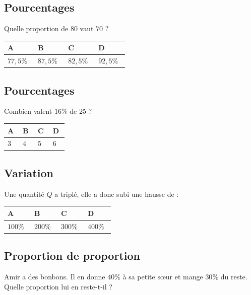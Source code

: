 \documentclass[oneside,12pt]{article}
\begin{document}
\subsection{Pourcentages}
Quelle proportion de $80$ vaut $70$ ?

\begin{center}
	\renewcommand{\arraystretch}{1.35}
	\begin{tabular}{| P{0.22\linewidth} | P{0.22\linewidth} | P{0.22\linewidth} | P{0.22\linewidth} |} \hline
	A & B & C & D \\ \hline
	$77,5\%$ & $87,5\%$ & $82,5\%$ & $92,5\%$ \\\hline
	\end{tabular}
\end{center}



\subsection{Pourcentages}
Combien valent $16\%$ de 25 ? 

\begin{center}
	\renewcommand{\arraystretch}{1.35}
	\begin{tabular}{| P{0.22\linewidth} | P{0.22\linewidth} | P{0.22\linewidth} | P{0.22\linewidth} |} \hline
	A & B & C & D \\ \hline
	$3$ & $4$ & $5$ & $6$ \\\hline
	\end{tabular}
\end{center}



\subsection{Variation}
Une quantité $Q$ a triplé, elle a donc subi une hausse de :

\begin{center}
	\renewcommand{\arraystretch}{1.35}
	\begin{tabular}{| P{0.22\linewidth} | P{0.22\linewidth} | P{0.22\linewidth} | P{0.22\linewidth} |} \hline
	A & B & C & D \\ \hline
	$100\%$ & $200\%$ & $300\%$ & $400\%$ \\\hline
	\end{tabular}
\end{center}



\subsection{Proportion de proportion}
Amir a des bonbons. Il en donne $40\%$ à sa petite sœur et mange $30\%$ du reste. Quelle proportion lui en reste-t-il ?
\end{document}

